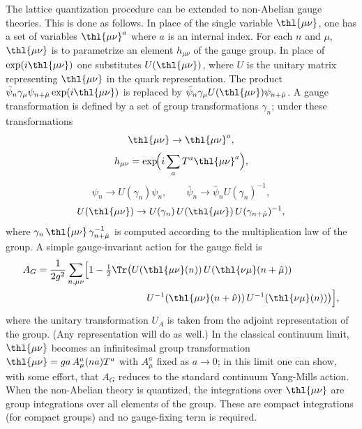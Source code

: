 The lattice quantization procedure can be extended to non-Abelian gauge
theories.  This is done as follows.  In place of the single variable
$\thl{\mu\nu}$, one has a set of variables $\thl{\mu\nu}^{a}$ where $a$
is an internal index.  For each $n$ and $\mu$, $\thl{\mu\nu}$ is to
parametrize an element $h_{\mu\nu}$ of the gauge group.  In place of
$\exp(i\thl{\mu\nu})$ one substitutes $U(\thl{\mu\nu})$, where $U$ is the
unitary matrix representing $\thl{\mu\nu}$ in the quark representation.
The product $\bar\psi_{n}\gamma_{\mu}\psi_{n+\hat\mu}\exp(i\thl{\mu\nu})$
is replaced by $\bar\psi_{n}\gamma_{\mu}U(\thl{\mu\nu})\psi_{n+\hat\mu}$.
A gauge transformation is defined by a set of group transformations
$\gamma_{n}$; under these transformations
\begin{equation}
\thl{\mu\nu} \to \thl{\mu\nu}^{a},
\label{eq:3.25}
\end{equation}
\begin{equation}
h_{\mu\nu} = \exp\!\Bigl(i\sum_{a}T^{a}\thl{\mu\nu}^{a}\Bigr),
\label{eq:3.26}
\end{equation}
\begin{equation}
\psi_{n} \to U(\gamma_{n})\psi_{n},\qquad
\bar\psi_{n} \to \bar\psi_{n}U(\gamma_{n})^{-1},
\label{eq:3.27}
\end{equation}
\begin{equation}
U(\thl{\mu\nu}) \to U(\gamma_{n})\,U(\thl{\mu\nu})\,U(\gamma_{n+\hat\mu})^{-1},
\label{eq:3.28}
\end{equation}
where $\gamma_{n}\,\thl{\mu\nu}\,\gamma_{n+\hat\mu}^{-1}$ is computed
according to the multiplication law of the group.  A simple
gauge-invariant action for the gauge field is
\begin{equation}
\begin{split}
A_{G} = \frac{1}{2g^{2}}\sum_{n,\mu\nu}\Bigl[1-\tfrac{1}{2}\Tr
    &\bigl(U(\thl{\mu\nu}(n))\,U(\thl{\nu\mu}(n+\hat\mu))\\
    &\qquad U^{-1}(\thl{\mu\nu}(n+\hat\nu))\,U^{-1}(\thl{\nu\mu}(n))\bigr)\Bigr],
\end{split}
\label{eq:3.29}
\end{equation}
where the unitary transformation $U_{A}$ is taken from the adjoint
representation of the group.  (Any representation will do as well.)  In
the classical continuum limit, $\thl{\mu\nu}$ becomes an infinitesimal
group transformation $\thl{\mu\nu} = ga\,A_{\mu}^{a}(na)T^{a}$ with
$A_{\mu}^{a}$ fixed as $a\to0$; in this limit one can show, with some
effort, that $A_{G}$ reduces to the standard continuum Yang-Mills action.
When the non-Abelian theory is quantized, the integrations over
$\thl{\mu\nu}$ are group integrations over all elements of the group.
These are compact integrations (for compact groups) and no gauge-fixing
term is required.

